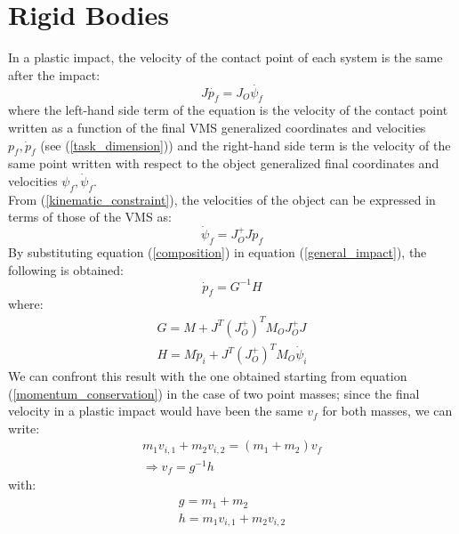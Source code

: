 \documentclass[a4paper,12pt,oneside]{report}
\begin{document}
\section{Rigid Bodies}\label{rigid}
In a plastic impact, the velocity of the contact point of each system is the same after the impact:
\begin{equation}
  J\dot{p_f}=J_O\dot{\psi_f}
  \label{kinematic_constraint}
\end{equation}
where the left-hand side term of the equation is the velocity of the contact point written as a function of the final VMS generalized coordinates and velocities $p_f,\dot{p}_f$ (see (\ref{task_dimension})) and the right-hand side term is the velocity of the same point written with respect to the object generalized final coordinates and velocities $\psi_f,\dot{\psi}_f$.\\
From (\ref{kinematic_constraint}), the velocities of the object can be expressed in terms of those of the VMS as:
\begin{equation}
  \dot{\psi}_f=J_O^+J\dot{p}_f
  \label{composition}
\end{equation}
By substituting equation (\ref{composition}) in equation (\ref{general_impact}), the following is obtained:
\begin{equation}
  \dot{p}_f=G^{-1}H
  \label{final_velocities}
\end{equation}
where:
\begin{equation}
  \begin{array}{l}
    G=M+J^T(J_O^+)^TM_OJ_O^+J\\
    H=M\dot{p}_i+J^T(J_O^+)^TM_O\dot{\psi}_i
  \end{array}
\end{equation}
We can confront this result with the one obtained starting from equation (\ref{momentum_conservation}) in the case of two point masses; since the final velocity in a plastic impact would have been the same $v_f$ for both masses, we can write:
\begin{equation}
  \begin{array}{l}
  m_1v_{i,1}+m_2v_{i,2}=(m_1+m_2)v_f\\
  \Rightarrow v_f=g^{-1}h
  \end{array}
\end{equation}
with:
\begin{equation}
  \begin{array}{l}
    g=m_1+m_2\\
    h=m_1v_{i,1}+m_2v_{i,2}
  \end{array}
\end{equation}
\end{document}
